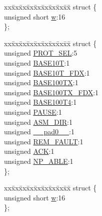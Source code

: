 \begin{DoxyCompactItemize}
\begin{tabbing}
\end{tabbing}\item 
\begin{tabbing}
xx\=xx\=xx\=xx\=xx\=xx\=xx\=xx\=xx\=\kill
struct \{\\
\>unsigned short \hyperlink{union_____a_n_l_p_a_dbits__t_a160850a4684a3e82c2323033964f2e98}{w}:16\\
\}; \\

\end{tabbing}\item 
\begin{tabbing}
xx\=xx\=xx\=xx\=xx\=xx\=xx\=xx\=xx\=\kill
struct \{\\
\>unsigned \hyperlink{union_____a_n_l_p_a_dbits__t_a05f4c23498c1cea5cfbfbbbc964f044b}{PROT\_SEL}:5\\
\>unsigned \hyperlink{union_____a_n_l_p_a_dbits__t_a19e0499585f3d54c98df590edff71b52}{BASE10T}:1\\
\>unsigned \hyperlink{union_____a_n_l_p_a_dbits__t_a60f1f5eeed205a15bb647dffff3a2ee3}{BASE10T\_FDX}:1\\
\>unsigned \hyperlink{union_____a_n_l_p_a_dbits__t_ad869e01954d2d35cb31bd254c50c44e1}{BASE100TX}:1\\
\>unsigned \hyperlink{union_____a_n_l_p_a_dbits__t_a62518f2f0d4bbb7e6f305cf513b7db56}{BASE100TX\_FDX}:1\\
\>unsigned \hyperlink{union_____a_n_l_p_a_dbits__t_ae7aa36d7ff2e31c4eb9726c67e04dfea}{BASE100T4}:1\\
\>unsigned \hyperlink{union_____a_n_l_p_a_dbits__t_ad4492e8a008bd744e8ee4a73bc202e78}{PAUSE}:1\\
\>unsigned \hyperlink{union_____a_n_l_p_a_dbits__t_a9ce4718733bcc9d125f46da36557d868}{ASM\_DIR}:1\\
\>unsigned \hyperlink{union_____a_n_l_p_a_dbits__t_adf71f3d8410c1f1dbbc96680a92c49af}{\_\_pad0\_\_}:1\\
\>unsigned \hyperlink{union_____a_n_l_p_a_dbits__t_acff720284bf641e0b589ea7feb2d3199}{REM\_FAULT}:1\\
\>unsigned \hyperlink{union_____a_n_l_p_a_dbits__t_a9d5913829bb2b681dc6257fc7e9b7a56}{ACK}:1\\
\>unsigned \hyperlink{union_____a_n_l_p_a_dbits__t_a4502f03b3664f0c1b02bfbfdae50f349}{NP\_ABLE}:1\\
\}; \\

\end{tabbing}\item 
\begin{tabbing}
xx\=xx\=xx\=xx\=xx\=xx\=xx\=xx\=xx\=\kill
struct \{\\
\>unsigned short \hyperlink{union_____a_n_l_p_a_dbits__t_a160850a4684a3e82c2323033964f2e98}{w}:16\\
\}; \\

\end{tabbing}\end{DoxyCompactItemize}


